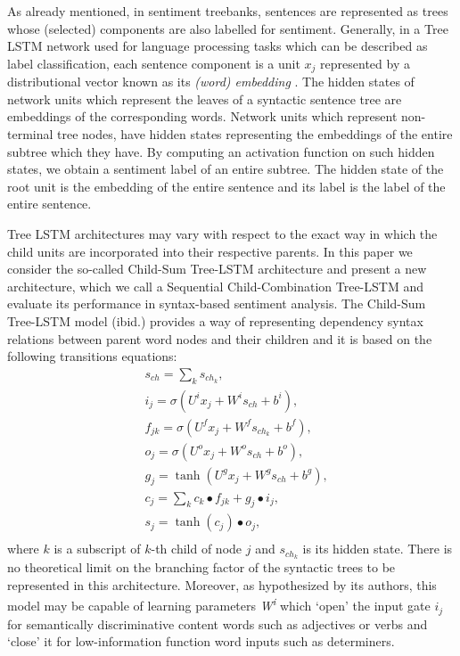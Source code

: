 \documentclass[10pt, a4paper]{article}
\begin{document}
As already mentioned, in sentiment treebanks, sentences are represented as trees whose (selected) components are also labelled for sentiment. Generally, in a Tree LSTM network used for language processing tasks which can be described as label classification, each sentence component is a unit $x_j$ represented by a distributional vector known as its \textit{(word) embedding} \cite{mikolov2013distributed}. The hidden states of network units which represent the leaves of a syntactic sentence tree are embeddings of the corresponding words. Network units which represent non-terminal tree nodes, have hidden states representing the embeddings of the entire subtree which they have. By computing an activation function on such hidden states, we obtain a sentiment label of an entire subtree. The hidden state of the root unit is the embedding of the entire sentence and its label is the label of the entire sentence.
\par	Tree LSTM architectures may vary with respect to the exact way in which the child units are incorporated into their respective parents. In this paper we consider the so-called Child-Sum Tree-LSTM architecture \cite{tai2015improved} and present a new architecture, which we call a Sequential Child-Combination Tree-LSTM and evaluate its performance in syntax-based sentiment analysis. The Child-Sum Tree-LSTM model (ibid.) provides a way of representing dependency syntax relations between parent word nodes and their children and it is based on the following transitions equations:
\begin{equation}
\begin{split}
&s_{ch}=\sum_{k}s_{ch_k},\\
&i_j = \sigma(U^ix_j + W^is_{ch} + b^i) ,\\
&f_{jk} = \sigma(U^fx_j + W^fs_{ch_k} + b^f) ,\\
&o_j = \sigma(U^ox_j + W^os_{ch} + b^o) ,\\
&g_j = \tanh(U^gx_j+ W^gs_{ch} + b^g) ,\\
&c_j = \sum_{k} c_k \bullet f_{jk} + g_{j} \bullet i_{j} ,\\
&s_j = \tanh({c_{j}}) \bullet o_{j},\\
\end{split}
\end{equation}
	where $k$ is a subscript of $k$-th child of node $j$ and $s_{ch_k}$ is its hidden state. There is no theoretical limit on the branching factor of the syntactic trees to be represented in this architecture. Moreover, as hypothesized by its authors, this model may be capable of learning parameters \textit{W\textsuperscript{i}} which `open' the input gate \textit{$i_{j}$} for semantically discriminative content words such as adjectives or verbs and `close' it for low-information function word inputs such as determiners. 
\end{document}

